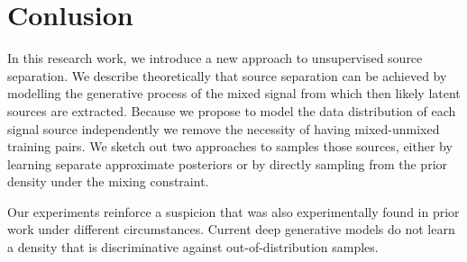 \chapter{Conlusion}
In this research work, we introduce a new approach to unsupervised source separation. We describe theoretically that source separation can be achieved by modelling the generative process of the mixed signal from which then likely latent sources are extracted. Because we propose to model the data distribution of each signal source independently we remove the necessity of having mixed-unmixed training pairs. We sketch out two approaches to samples those sources, either by learning separate approximate posteriors or by directly sampling from the prior density under the mixing constraint.

Our experiments reinforce a suspicion that was also experimentally found in prior work under different circumstances. Current deep generative models do not learn a density that is discriminative against out-of-distribution samples.
